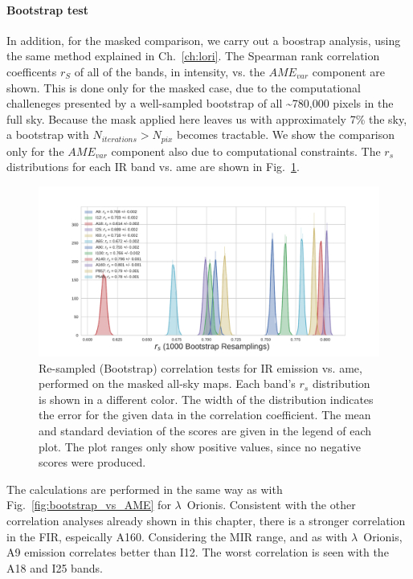           \paragraph{Bootstrap test}
              In addition, for the masked comparison, we carry out a boostrap analysis, using the same method explained in Ch.~\ref{ch:lori}. The Spearman rank correlation coefficents $r_{S}$ of all of the bands, in intensity, vs. the $AME_{var}$ component are shown. This is done only for the masked case, due to the computational challeneges presented by a well-sampled bootstrap of all \textasciitilde{}780,000 pixels in the full sky. Because the mask applied here leaves us with approximately 7\% the sky, a bootstrap with $N_{iterations} > N_{pix}$ becomes tractable. We show the comparison only for the $AME_{var}$ component also due to computational constraints. The $r_{s}$ distributions for each IR band vs. \acrshort{ame} are shown in Fig.~\ref{fig:bootstrap_vs_AME_allsky_masked}.
                \begin{figure}
                     \includegraphics[width=\textwidth,trim={3cm 0.25cm 2.5cm 1cm},clip]{../Plots/ch_allsky/bootstrap_vs_AME_spearman_maskall_i1000.pdf}
                     \centering
                     \caption{Re-sampled (Bootstrap) correlation tests for IR emission vs. \acrshort{ame}, performed on the masked all-sky maps. Each band's $r_{s}$ distribution is shown in a different color. The width of the distribution indicates the error for the given data in the correlation coefficient. The mean and standard deviation of the scores are given in the legend of each plot. The plot ranges only show positive values, since no negative scores were produced. }
                     \label{fig:bootstrap_vs_AME_allsky_masked}
                \end{figure}
            The calculations are performed in the same way as with Fig.~\ref{fig:bootstrap_vs_AME} for $\lambda$~Orionis. Consistent with the other correlation analyses already shown in this chapter, there is a stronger correlation in the FIR, espeically A160. Considering the MIR range, and as with $\lambda$~Orionis, A9 emission correlates better than I12. The worst correlation is seen with the A18 and I25 bands.
